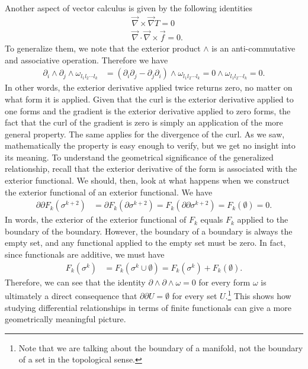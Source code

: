 Another aspect of vector calculus is given by the following identities
\begin{equation}
	\begin{aligned}
		&\vec{\nabla} \times \vec{\nabla} T = 0 \\
		&\vec{\nabla} \cdot \vec{\nabla} \times \vec{f} = 0.
	\end{aligned}
\end{equation}
To generalize them, we note that the exterior product $\wedge$ is an anti-commutative and associative operation. Therefore we have
\begin{equation}
	\begin{aligned}
		\partial_{i} \wedge \partial_{j} \wedge \omega_{l_1 l_2 \cdots l_{k}} &= (\partial_i \partial_j - \partial_j \partial_i) \wedge \omega_{l_1 l_2 \cdots l_{k}} = 0 \wedge \omega_{l_1 l_2 \cdots l_{k}} = 0.
	\end{aligned}
\end{equation}
In other words, the exterior derivative applied twice returns zero, no matter on what form it is applied. Given that the curl is the exterior derivative applied to one forms and the gradient is the exterior derivative applied to zero forms, the fact that the curl of the gradient is zero is simply an application of the more general property. The same applies for the divergence of the curl. As we saw, mathematically the property is easy enough to verify, but we get no insight into its meaning. To understand the geometrical significance of the generalized relationship, recall that the exterior derivative of the form is associated with the exterior functional. We should, then, look at what happens when we construct the exterior functional of an exterior functional. We have
\begin{equation}
	\begin{aligned}
		\partial \partial F_k (\sigma^{k+2}) &= \partial F_k (\partial \sigma^{k+2}) = F_k (\partial \partial \sigma^{k+2}) = F_k(\emptyset) = 0.
	\end{aligned}
\end{equation}
In words, the exterior of the exterior functional of $F_k$ equals $F_k$ applied to the boundary of the boundary. However, the boundary of a boundary is always the empty set, and any functional applied to the empty set must be zero. In fact, since functionals are additive, we must have
\begin{equation}
	\begin{aligned}
		F_k(\sigma^k) &= F_k(\sigma^k \cup \emptyset) = F_k(\sigma^k) + F_k(\emptyset).
	\end{aligned}
\end{equation}
Therefore, we can see that the identity $\partial \wedge \partial \wedge \omega = 0$ for every form $\omega$ is ultimately a direct consequence that $\partial \partial U = \emptyset$ for every set $U$.\footnote{Note that we are talking about the boundary of a manifold, not the boundary of a set in the topological sense.} This shows how studying differential relationships in terms of finite functionals can give a more geometrically meaningful picture.

